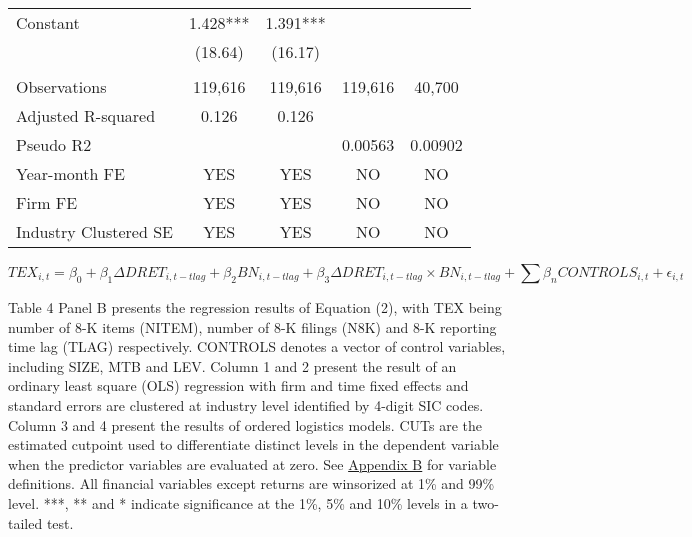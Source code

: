 \begin{table}[H]
\begin{center}
\begin{tabular}{lcccc}
			Constant & 1.428*** & 1.391*** &   &  \\
			& (18.64) & (16.17) &   &  \\
			&   &   &   &  \\
			Observations & 119,616 & 119,616 & 119,616 & 40,700 \\
			Adjusted R-squared & 0.126 & 0.126 &   &  \\
			Pseudo R2 &   &   & 0.00563 & 0.00902 \\
			Year-month FE & YES & YES & NO & NO \\
			Firm FE & YES & YES & NO & NO \\
			Industry Clustered SE & YES & YES & NO & NO \\
			\bottomrule
			\bottomrule
		\end{tabular}%
	\end{center}
		\begin{footnotesize}
			\setcounter{equation}{1}
			\begin{equation}
				TEX_{i,t}=\beta_0+\beta_1\Delta DRET_{i,t-tlag}+\beta_2BN_{i,t-tlag}+\beta_3\Delta DRET_{i,t-tlag}\times 	BN_{i,t-tlag}+\sum\beta_nCONTROLS_{i,t}+\epsilon_{i,t}
			\end{equation}
			
			\noindent Table 4 Panel B presents the regression results of Equation (2), with TEX being number of 8-K items (NITEM), number of 8-K filings (N8K) and 8-K reporting time lag (TLAG) respectively. CONTROLS denotes a vector of control variables, including SIZE, MTB and LEV. Column 1 and 2 present the result of an ordinary least square (OLS) regression with firm and time fixed effects and standard errors are clustered at industry level identified by 4-digit SIC codes. Column 3 and 4 present the results of ordered logistics models. CUTs are the estimated cutpoint used to differentiate distinct levels in the dependent variable when the predictor variables are evaluated at zero. See \hyperref[appb]{Appendix B} for variable definitions. All financial variables except returns are winsorized at 1\% and 99\% level. ***, ** and * indicate significance at the 1\%, 5\% and 10\% levels in a two-tailed test. 
		\end{footnotesize}
\end{table}%
